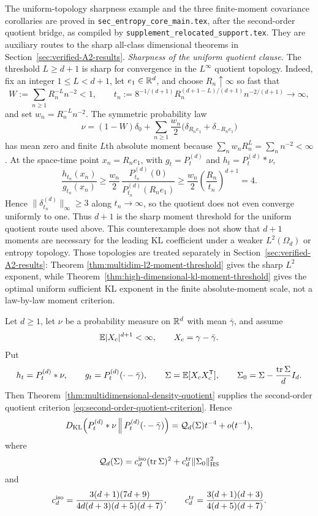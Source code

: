 \ifdefined\JFAArticleMain
The uniform-topology sharpness example and the three finite-moment covariance
corollaries are proved in \texttt{sec\_entropy\_core\_main.tex}, after the
second-order quotient bridge, as compiled by
\texttt{supplement\_relocated\_support.tex}.  They are auxiliary routes to the
sharp all-class dimensional theorems in Section~\ref{sec:verified-A2-results}.
\else
\noindent\emph{Sharpness of the uniform quotient clause.}
The threshold \(L\ge d+1\) is sharp for convergence in the
\(L^\infty\) quotient topology.  Indeed, fix an integer
\(1\le L<d+1\), let \(e_1\in\mathbb{R}^d\), and choose \(R_n\uparrow\infty\) so
fast that
\[
  W:=\sum_{n\ge1}R_n^{-L}n^{-2}<1,
  \qquad
  t_n:=8^{-1/(d+1)}
  R_n^{(d+1-L)/(d+1)}n^{-2/(d+1)}\to\infty,
\]
and set \(w_n=R_n^{-L}n^{-2}\).  The symmetric probability law
\[
  \nu=(1-W)\delta_0
  +\sum_{n\ge1}\frac{w_n}{2}
  \bigl(\delta_{R_ne_1}+\delta_{-R_ne_1}\bigr)
\]
has mean zero and finite \(L\)th absolute moment because
\(\sum_n w_nR_n^L=\sum_n n^{-2}<\infty\).  At the space-time point
\(x_n=R_ne_1\), with \(g_t=P_t^{(d)}\) and \(h_t=P_t^{(d)}*\nu\),
\[
\frac{h_{t_n}(x_n)}{g_{t_n}(x_n)}
\ge
\frac{w_n}{2}\,
\frac{P_{t_n}^{(d)}(0)}{P_{t_n}^{(d)}(R_ne_1)}
\ge
\frac{w_n}{2}\left(\frac{R_n}{t_n}\right)^{d+1}
=4 .
\]
Hence \(\|\delta_{t_n}^{(d)}\|_\infty\ge3\) along \(t_n\to\infty\), so
the quotient does not even converge uniformly to one.  Thus \(d+1\) is the
sharp moment threshold for the uniform quotient route used above.  This
counterexample does not show that \(d+1\) moments are necessary for the
leading KL coefficient under a weaker \(L^2(\Omega_d)\) or entropy topology.
Those topologies are treated separately in
Section~\ref{sec:verified-A2-results}: Theorem
\ref{thm:multidim-l2-moment-threshold} gives the sharp \(L^2\) exponent,
while Theorem~\ref{thm:high-dimensional-kl-moment-threshold} gives the
optimal uniform sufficient KL exponent in the finite absolute-moment scale,
not a law-by-law moment criterion.

\begin{corollary}%
\label{cor:finite-dplusone-moment-leading-multidim-coefficient}
Let \(d\ge1\), let \(\nu\) be a probability measure on \(\mathbb{R}^d\) with mean
\(\bar{\gamma}\), and assume
\[
  \mathbb{E} |X_c|^{d+1}<\infty,\qquad X_c=\gamma-\bar{\gamma} .
\]
Put
\[
  h_t=P_t^{(d)}*\nu,\qquad
  g_t=P_t^{(d)}(\cdot-\bar{\gamma}),\qquad
  \Sigma=\mathbb{E}[X_cX_c^{\mathsf T}],\qquad
  \Sigma_0=\Sigma-\frac{\operatorname{tr}\Sigma}{d}I_d .
\]
Then Theorem~\ref{thm:multidimensional-density-quotient} supplies the
second-order quotient criterion
\eqref{eq:second-order-quotient-criterion}.  Hence
\[
D_{\rm KL}\!\left(P_t^{(d)}*\nu\,\middle\|\,
P_t^{(d)}(\cdot-\bar{\gamma})\right)
=\mathcal Q_d(\Sigma)t^{-4}+o(t^{-4}),
\]
where
\[
\mathcal Q_d(\Sigma)
=c_d^{\rm iso}(\operatorname{tr}\Sigma)^2
+c_d^{\rm tr}\|\Sigma_0\|_{\rm HS}^2
\]
and
\[
c_d^{\rm iso}=
\frac{3(d+1)(7d+9)}
{4d(d+3)(d+5)(d+7)},
\qquad
c_d^{\rm tr}=
\frac{3(d+1)(d+3)}
{4(d+5)(d+7)} .
\]
\end{corollary}

